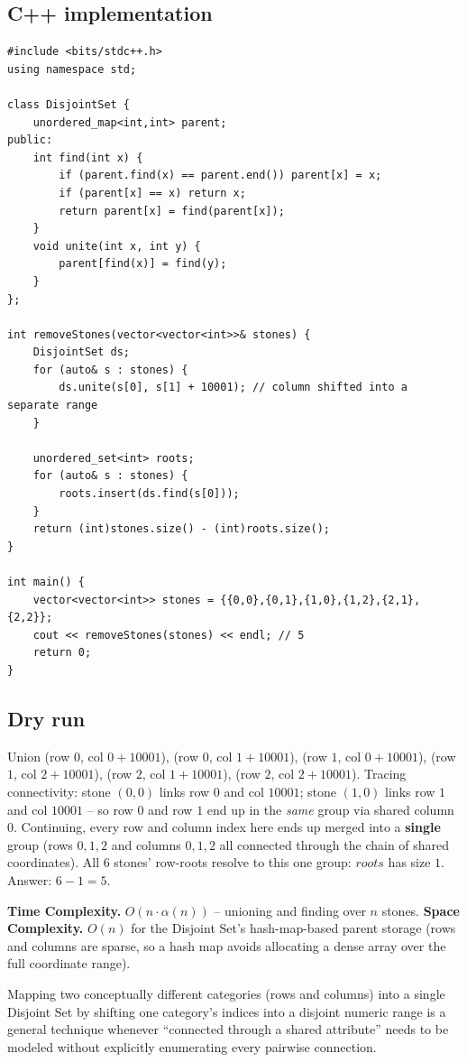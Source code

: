 \subsection*{C++ implementation}

\begin{lstlisting}
#include <bits/stdc++.h>
using namespace std;

class DisjointSet {
    unordered_map<int,int> parent;
public:
    int find(int x) {
        if (parent.find(x) == parent.end()) parent[x] = x;
        if (parent[x] == x) return x;
        return parent[x] = find(parent[x]);
    }
    void unite(int x, int y) {
        parent[find(x)] = find(y);
    }
};

int removeStones(vector<vector<int>>& stones) {
    DisjointSet ds;
    for (auto& s : stones) {
        ds.unite(s[0], s[1] + 10001); // column shifted into a separate range
    }

    unordered_set<int> roots;
    for (auto& s : stones) {
        roots.insert(ds.find(s[0]));
    }
    return (int)stones.size() - (int)roots.size();
}

int main() {
    vector<vector<int>> stones = {{0,0},{0,1},{1,0},{1,2},{2,1},{2,2}};
    cout << removeStones(stones) << endl; // 5
    return 0;
}
\end{lstlisting}

\subsection*{Dry run}


Union (row $0$, col $0{+}10001$), (row $0$, col $1{+}10001$), (row
$1$, col $0{+}10001$), (row $1$, col $2{+}10001$), (row $2$, col
$1{+}10001$), (row $2$, col $2{+}10001$). Tracing connectivity: stone
$(0,0)$ links row $0$ and col $10001$; stone $(1,0)$ links row $1$ and
col $10001$ -- so row $0$ and row $1$ end up in the \emph{same} group
via shared column $0$. Continuing, every row and column index here
ends up merged into a \textbf{single} group (rows $0,1,2$ and columns
$0,1,2$ all connected through the chain of shared coordinates). All
$6$ stones' row-roots resolve to this one group: $\textit{roots}$ has
size $1$. Answer: $6 - 1 = 5$.

\begin{complexitybox}
\textbf{Time Complexity.} $O(n \cdot \alpha(n))$ -- unioning and
finding over $n$ stones.
\textbf{Space Complexity.} $O(n)$ for the Disjoint Set's hash-map-based
parent storage (rows and columns are sparse, so a hash map avoids
allocating a dense array over the full coordinate range).
\end{complexitybox}

\begin{takeawaybox}
Mapping two conceptually different categories (rows and columns) into
a single Disjoint Set by shifting one category's indices into a
disjoint numeric range is a general technique whenever ``connected
through a shared attribute'' needs to be modeled without explicitly
enumerating every pairwise connection.
\end{takeawaybox}

